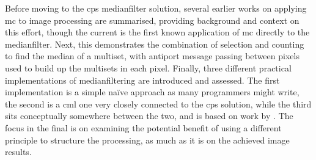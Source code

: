 Before moving to the \gls{cps} \gls{medianfilter} solution, several earlier works on applying \gls{mc} to image processing are summarised, providing background and context on this effort, though the current  is the first known application of \gls{mc} directly to the \gls{medianfilter}.  Next, this  demonstrates the combination of selection and counting to find the median of a multiset, with antiport message passing between pixels used to build up the multisets in each pixel.  Finally, three different practical implementations of \gls{medianfilter}ing are introduced and assessed.  The first implementation is a simple naïve approach as many programmers might write, the second is a \gls{cml} one very closely connected to the \gls{cps} solution, while the third sits conceptually somewhere between the two, and is based on work by \citeauthor{Braunl2001} \cite{Braunl2001}.  The focus in the final  is on examining the potential benefit of using a different principle to structure the processing, as much as it is on the achieved image results.%